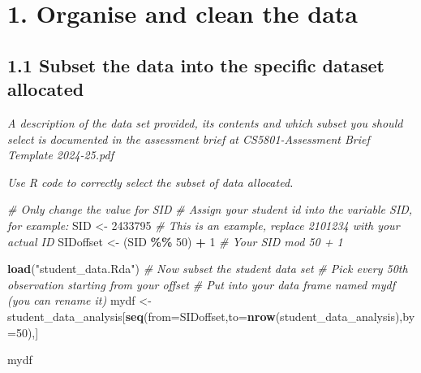 \documentclass[
]{article}
\newenvironment{Shaded}{\begin{snugshade}}{\end{snugshade}}
\newcommand{\AttributeTok}[1]{\textcolor[rgb]{0.13,0.29,0.53}{#1}}
\newcommand{\CommentTok}[1]{\textcolor[rgb]{0.56,0.35,0.01}{\textit{#1}}}
\newcommand{\DecValTok}[1]{\textcolor[rgb]{0.00,0.00,0.81}{#1}}
\newcommand{\FunctionTok}[1]{\textcolor[rgb]{0.13,0.29,0.53}{\textbf{#1}}}
\newcommand{\NormalTok}[1]{#1}
\newcommand{\OtherTok}[1]{\textcolor[rgb]{0.56,0.35,0.01}{#1}}
\newcommand{\SpecialCharTok}[1]{\textcolor[rgb]{0.81,0.36,0.00}{\textbf{#1}}}
\newcommand{\StringTok}[1]{\textcolor[rgb]{0.31,0.60,0.02}{#1}}
\begin{document}
\section{1. Organise and clean the
data}\label{organise-and-clean-the-data}

\subsection{1.1 Subset the data into the specific dataset
allocated}\label{subset-the-data-into-the-specific-dataset-allocated}

\emph{A description of the data set provided, its contents and which
subset you should select is documented in the assessment brief at
CS5801-Assessment Brief Template 2024-25.pdf}

\emph{Use R code to correctly select the subset of data allocated.}

\begin{Shaded}
\begin{Highlighting}[]
\CommentTok{\# Only change the value for SID }
\CommentTok{\# Assign your student id into the variable SID, for example:}
\NormalTok{SID }\OtherTok{\textless{}{-}} \DecValTok{2433795}                 \CommentTok{\# This is an example, replace 2101234 with your actual ID}
\NormalTok{SIDoffset }\OtherTok{\textless{}{-}}\NormalTok{ (SID }\SpecialCharTok{\%\%} \DecValTok{50}\NormalTok{) }\SpecialCharTok{+} \DecValTok{1}    \CommentTok{\# Your SID mod 50 + 1}

\FunctionTok{load}\NormalTok{(}\StringTok{"student\_data.Rda"}\NormalTok{)}
\CommentTok{\# Now subset the student data set}
\CommentTok{\# Pick every 50th observation starting from your offset}
\CommentTok{\# Put into your data frame named mydf (you can rename it)}
\NormalTok{mydf }\OtherTok{\textless{}{-}}\NormalTok{ student\_data\_analysis[}\FunctionTok{seq}\NormalTok{(}\AttributeTok{from=}\NormalTok{SIDoffset,}\AttributeTok{to=}\FunctionTok{nrow}\NormalTok{(student\_data\_analysis),}\AttributeTok{by=}\DecValTok{50}\NormalTok{),]}
\end{Highlighting}
\end{Shaded}

\begin{Shaded}
\begin{Highlighting}[]
\NormalTok{mydf}
\end{Highlighting}
\end{Shaded}
\end{document}
